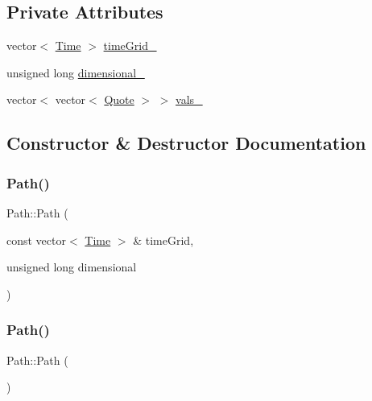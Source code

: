 \subsection*{Private Attributes}
\begin{DoxyCompactItemize}
\item 
vector$<$ \hyperlink{_name_def_8h_ac2d3e0ba793497bcca555c7c2cf64ff3}{Time} $>$ \hyperlink{class_path_a89dcf892f7c979692e1bdb12811a2db1}{time\+Grid\+\_\+}
\item 
unsigned long \hyperlink{class_path_a577d3370c9142a9e73c2118799c6a8a2}{dimensional\+\_\+}
\item 
vector$<$ vector$<$ \hyperlink{_name_def_8h_a642a6c5fd87319d922637de0e0bb0305}{Quote} $>$ $>$ \hyperlink{class_path_ac8b906724bca24f9ec14ad754559e27a}{vals\+\_\+}
\end{DoxyCompactItemize}


\subsection{Constructor \& Destructor Documentation}
\hypertarget{class_path_a589f506da73b9b80f21a27102656b2ba}{}\label{class_path_a589f506da73b9b80f21a27102656b2ba} 
\subsubsection{\texorpdfstring{Path()}{Path()}\hspace{0.1cm}{\footnotesize\ttfamily [1/2]}}
{\footnotesize\ttfamily Path\+::\+Path (\begin{DoxyParamCaption}\item[{const vector$<$ \hyperlink{_name_def_8h_ac2d3e0ba793497bcca555c7c2cf64ff3}{Time} $>$ \&}]{time\+Grid,  }\item[{unsigned long}]{dimensional }\end{DoxyParamCaption})}

\hypertarget{class_path_a6ae58f503394f12a90ff7d059d30d26c}{}\label{class_path_a6ae58f503394f12a90ff7d059d30d26c} 
\subsubsection{\texorpdfstring{Path()}{Path()}\hspace{0.1cm}{\footnotesize\ttfamily [2/2]}}
{\footnotesize\ttfamily Path\+::\+Path (\begin{DoxyParamCaption}{ }\end{DoxyParamCaption})\hspace{0.3cm}{\ttfamily [default]}}

